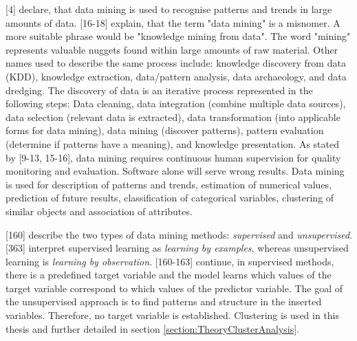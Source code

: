 \textcite{DataMiningAndPredictiveAnalytics}[4] declare, that data mining is used to recognise patterns and trends in large amounts of data. \textcite{han2011data}[16-18] explain, that the term "data mining" is a misnomer. A more suitable phrase would be "knowledge mining from data". The word "mining" represents valuable nuggets found within large amounts of raw material. Other names used to describe the same process include: knowledge discovery from data (KDD), knowledge extraction, data/pattern analysis, data archaeology, and data dredging. The discovery of data is an iterative process represented in the following steps: Data cleaning, data integration (combine multiple data sources), data selection (relevant data is extracted), data transformation (into applicable forms for data mining), data mining (discover patterns), pattern evaluation (determine if patterns have a meaning), and knowledge presentation. 
As stated by \textcite{DataMiningAndPredictiveAnalytics}[9-13, 15-16], data mining requires continuous human supervision for quality monitoring and evaluation. Software alone will serve wrong results. Data mining is used for description of patterns and trends, estimation of numerical values, prediction of future results, classification of categorical variables, clustering of similar objects and association of attributes. 

\textcite{DataMiningAndPredictiveAnalytics}[160] describe the two types of data mining methods: \textit{supervised} and \textit{unsupervised}. \textcite{han2011data}[363] interpret supervised learning as \textit{learning by examples}, whereas unsupervised learning is \textit{learning by observation}. \textcite{DataMiningAndPredictiveAnalytics}[160-163] continue, in supervised methods, there is a predefined target variable and the model learns which values of the target variable correspond to which values of the predictor variable. The goal of the unsupervised approach is to find patterns and structure in the inserted variables. Therefore, no target variable is established. Clustering is used in this thesis and further detailed in section \ref{section:TheoryClusterAnalysis}.

